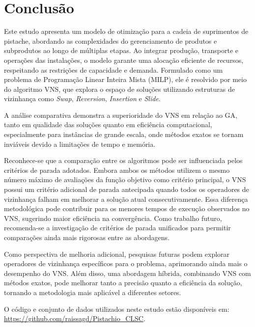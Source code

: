 \documentclass[conference]{IEEEtran}
\begin{document}

\section{Conclusão}
\label{sec:conclusion1}

Este estudo apresenta um modelo de otimização para a cadeia de suprimentos de pistache, abordando as complexidades do gerenciamento de produtos e subprodutos ao longo de múltiplas etapas. 
Ao integrar produção, transporte e operações das instalações, o modelo garante uma alocação eficiente de recursos, respeitando as restrições de capacidade e demanda. Formulado como um problema 
de Programação Linear Inteira Mista (MILP), ele é resolvido por meio do algoritmo VNS, que explora o espaço de soluções utilizando estruturas de vizinhança como \textit{Swap}, \textit{Reversion}, \textit{Insertion} e \textit{Slide}.

A análise comparativa demonstra a superioridade do VNS em relação ao GA, tanto em qualidade das soluções quanto em eficiência computacional, especialmente para 
instâncias de grande escala, onde métodos exatos se tornam inviáveis devido a limitações de tempo e memória.

Reconhece-se que a comparação entre os algoritmos pode ser influenciada pelos critérios de parada adotados. Embora ambos os métodos utilizem o mesmo número máximo de avaliações da função 
objetivo como critério principal, o VNS possui um critério adicional de parada antecipada quando todos os operadores de vizinhança falham em melhorar a solução atual consecutivamente. 
Essa diferença metodológica pode contribuir para os menores tempos de execução observados no VNS, sugerindo maior eficiência na convergência. Como trabalho futuro, recomenda-se a 
investigação de critérios de parada unificados para permitir comparações ainda mais rigorosas entre as abordagens.

Como perspectiva de melhoria adicional, pesquisas futuras podem explorar operadores de vizinhança específicos para o problema, aprimorando ainda mais o desempenho do VNS. Além disso, uma abordagem híbrida, combinando VNS com métodos 
exatos, pode melhorar tanto a precisão quanto a eficiência da solução, tornando a metodologia mais aplicável a diferentes setores.

O código e conjunto de dados utilizados neste estudo estão disponíveis em: \url{https://github.com/raissagd/Pistachio_CLSC}.
\end{document}
